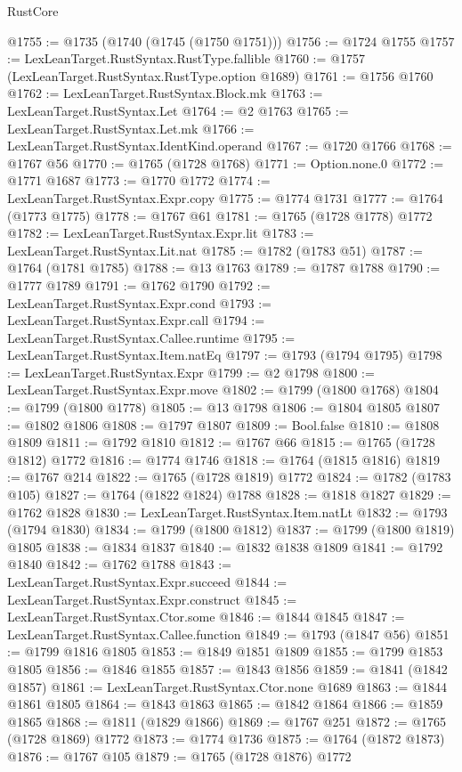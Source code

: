 \begin{lexlean}{RustCore}
\begin{coremodule}
@1755 := @1735 (@1740 (@1745 (@1750 @1751)))
@1756 := @1724 @1755
@1757 := LexLeanTarget.RustSyntax.RustType.fallible
@1760 := @1757 (LexLeanTarget.RustSyntax.RustType.option @1689)
@1761 := @1756 @1760
@1762 := LexLeanTarget.RustSyntax.Block.mk
@1763 := LexLeanTarget.RustSyntax.Let
@1764 := @2 @1763
@1765 := LexLeanTarget.RustSyntax.Let.mk
@1766 := LexLeanTarget.RustSyntax.IdentKind.operand
@1767 := @1720 @1766
@1768 := @1767 @56
@1770 := @1765 (@1728 @1768)
@1771 := Option.none.{0}
@1772 := @1771 @1687
@1773 := @1770 @1772
@1774 := LexLeanTarget.RustSyntax.Expr.copy
@1775 := @1774 @1731
@1777 := @1764 (@1773 @1775)
@1778 := @1767 @61
@1781 := @1765 (@1728 @1778) @1772
@1782 := LexLeanTarget.RustSyntax.Expr.lit
@1783 := LexLeanTarget.RustSyntax.Lit.nat
@1785 := @1782 (@1783 @51)
@1787 := @1764 (@1781 @1785)
@1788 := @13 @1763
@1789 := @1787 @1788
@1790 := @1777 @1789
@1791 := @1762 @1790
@1792 := LexLeanTarget.RustSyntax.Expr.cond
@1793 := LexLeanTarget.RustSyntax.Expr.call
@1794 := LexLeanTarget.RustSyntax.Callee.runtime
@1795 := LexLeanTarget.RustSyntax.Item.natEq
@1797 := @1793 (@1794 @1795)
@1798 := LexLeanTarget.RustSyntax.Expr
@1799 := @2 @1798
@1800 := LexLeanTarget.RustSyntax.Expr.move
@1802 := @1799 (@1800 @1768)
@1804 := @1799 (@1800 @1778)
@1805 := @13 @1798
@1806 := @1804 @1805
@1807 := @1802 @1806
@1808 := @1797 @1807
@1809 := Bool.false
@1810 := @1808 @1809
@1811 := @1792 @1810
@1812 := @1767 @66
@1815 := @1765 (@1728 @1812) @1772
@1816 := @1774 @1746
@1818 := @1764 (@1815 @1816)
@1819 := @1767 @214
@1822 := @1765 (@1728 @1819) @1772
@1824 := @1782 (@1783 @105)
@1827 := @1764 (@1822 @1824) @1788
@1828 := @1818 @1827
@1829 := @1762 @1828
@1830 := LexLeanTarget.RustSyntax.Item.natLt
@1832 := @1793 (@1794 @1830)
@1834 := @1799 (@1800 @1812)
@1837 := @1799 (@1800 @1819) @1805
@1838 := @1834 @1837
@1840 := @1832 @1838 @1809
@1841 := @1792 @1840
@1842 := @1762 @1788
@1843 := LexLeanTarget.RustSyntax.Expr.succeed
@1844 := LexLeanTarget.RustSyntax.Expr.construct
@1845 := LexLeanTarget.RustSyntax.Ctor.some
@1846 := @1844 @1845
@1847 := LexLeanTarget.RustSyntax.Callee.function
@1849 := @1793 (@1847 @56)
@1851 := @1799 @1816 @1805
@1853 := @1849 @1851 @1809
@1855 := @1799 @1853 @1805
@1856 := @1846 @1855
@1857 := @1843 @1856
@1859 := @1841 (@1842 @1857)
@1861 := LexLeanTarget.RustSyntax.Ctor.none @1689
@1863 := @1844 @1861 @1805
@1864 := @1843 @1863
@1865 := @1842 @1864
@1866 := @1859 @1865
@1868 := @1811 (@1829 @1866)
@1869 := @1767 @251
@1872 := @1765 (@1728 @1869) @1772
@1873 := @1774 @1736
@1875 := @1764 (@1872 @1873)
@1876 := @1767 @105
@1879 := @1765 (@1728 @1876) @1772

\end{coremodule}
\end{lexlean}
